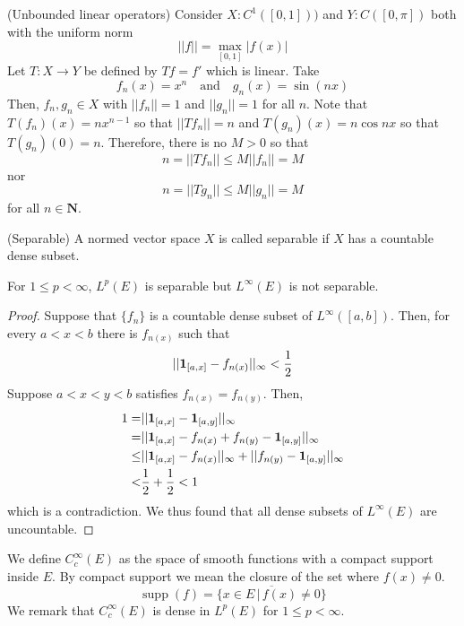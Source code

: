 \vspace{2ex}
\begin{ex}
(Unbounded linear operators) Consider $X:C^{1}([0,1]))$ and $Y:C([0,\pi ])$ both with the uniform norm 
\[||f||=\max_{[0,1]}|f(x)|\]
Let $T:X\rightarrow Y$ be defined by $Tf=f'$ which is linear. Take
\[f_{n}(x)=x^{n}\quad \mathrm{and}\quad g_{n}(x)=\sin (nx)\]
Then, $f_{n},g_{n}\in X$ with $||f_{n}||=1$ and $||g_{n}||=1$ for all $n$. Note that $T(f_{n})(x)=nx^{n-1}$ so that $||Tf_{n}||=n$ and $T(g_{n})(x)=n\cos nx$ so that $T(g_{n})(0)=n$. Therefore, there is no $M>0$ so that 
\[n=||Tf_{n}||\leq M||f_{n}||=M\] nor
\[n=||Tg_{n}||\leq M||g_{n}||=M\]
for all $n\in {\bm N}$.
\end{ex}
\vspace{2ex}
\begin{defi}
(Separable) A normed vector space $X$ is called separable if $X$ has a countable dense subset. 
\end{defi}
\vspace{2ex}
\begin{rmk}
For $1\leq p<\infty $, $L^{p}(E)$ is separable but $L^{\infty }(E)$ is not separable.
\end{rmk}
\vspace{2ex}
\begin{proof}
Suppose that $\{f_{n}\}$ is a countable dense subset of $L^{\infty }([a,b])$. Then, for every $a<x<b$ there is $f_{n(x)}$ such that 
\[||{\bf 1}_{[a,x]}-f_{n(x)}||_{\infty }<\dfrac{1}{2}\]
Suppose $a<x<y<b$ satisfies $f_{n(x)}=f_{n(y)}$. Then, 
\begin{align*}
1=&||{\bf 1}_{[a,x]}-{\bf 1}_{[a,y]}||_{\infty }\\
=&||{\bf 1}_{[a,x]}-f_{n(x)}+f_{n(y)}-{\bf 1}_{[a,y]}||_{\infty }\\
\leq &||{\bf 1}_{[a,x]}-f_{n(x)}||_{\infty }+||f_{n(y)}-{\bf 1}_{[a,y]}||_{\infty }\\
<& \dfrac{1}{2}+\dfrac{1}{2}<1
\end{align*}
which is a contradiction. We thus found that all dense subsets of $L^{\infty }(E)$ are uncountable. 
\end{proof}
\vspace{2ex}
\begin{rmk}
We define $C^{\infty }_{c}(E)$ as the space of smooth functions with a compact support inside $E$. By compact support we mean the closure of the set where $f(x)\ne 0$.
\[\mathop{\mathrm{supp}}(f)=\overline{\{x\in E \,|\, f(x)\ne 0 \}}\]
We remark that $C^{\infty }_{c}(E)$ is dense in $L^{p}(E)$ for $1\leq p< \infty $.
\end{rmk}
\vspace{2ex}

